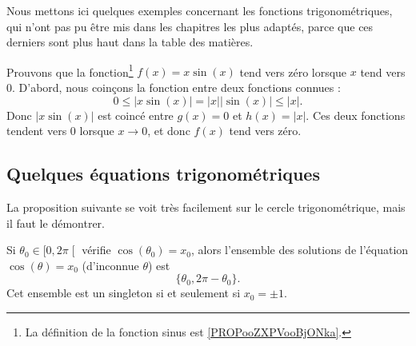 Nous mettons ici quelques exemples concernant les fonctions trigonométriques, qui n'ont pas pu être mis dans les chapitres les plus adaptés, parce que ces derniers sont plus haut dans la table des matières.

\begin{example}     \label{EXooSPFDooSluUGV}
	Prouvons que la fonction\footnote{La définition de la fonction sinus est \ref{PROPooZXPVooBjONka}.} \( f(x)=x\sin(x)\) tend vers zéro lorsque \( x\) tend vers \( 0\). D'abord, nous coinçons la fonction entre deux fonctions connues :
	\begin{equation}
		0\leq| x\sin(x) |=| x | |\sin(x) |\leq | x |.
	\end{equation}
	Donc \( | x\sin(x) |\) est coincé entre \( g(x)=0\) et \( h(x)=| x |\). Ces deux fonctions tendent vers \( 0\) lorsque \( x\to 0\), et donc \( f(x)\) tend vers zéro.
\end{example}

\subsection{Quelques équations trigonométriques}

La proposition suivante se voit très facilement sur le cercle trigonométrique, mais il faut le démontrer.
\begin{proposition}     \label{PROPooTUUUooVrAGQo}
	Si \( \theta_0\in \mathopen[ 0 , 2\pi \mathclose[\) vérifie \( \cos(\theta_0)=x_0\), alors l'ensemble des solutions de l'équation \( \cos(\theta)=x_0\) (d'inconnue \( \theta\)) est
	\begin{equation}
		\{ \theta_0,2\pi-\theta_0 \}.
	\end{equation}
	Cet ensemble est un singleton si et seulement si \( x_0=\pm1\).
\end{proposition}

